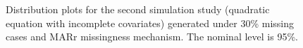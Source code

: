 \begin{figure}
\begin{center}
{{				}
			}
		\end{center}
		\caption{Distribution plots for the second simulation study (quadratic equation with incomplete covariates) generated under 30\% missing cases and MARr missingness mechanism. The nominal level is 95\%.}
		\label{fig6_5}
			\end{figure}
		
